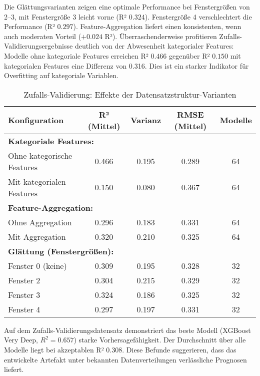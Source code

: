 Die Glättungsvarianten zeigen eine optimale Performance bei Fenstergrößen von 2–3, mit Fenstergröße 3 leicht vorne (R² $0.324$). Fenstergröße 4 verschlechtert die Performance (R² $0.297$). Feature-Aggregation liefert einen konsistenten, wenn auch moderaten Vorteil ($+0.024$ R²). Überraschenderweise profitieren Zufalls-Validierungsergebnisse deutlich von der Abwesenheit kategorialer Features: Modelle ohne kategoriale Features erreichen R² $0.466$ gegenüber R² $0.150$ mit kategorialen Features eine Differenz von 0.316. Dies ist ein starker Indikator für Overfitting auf kategoriale Variablen.

\begin{table}[H]
  \centering
  \begin{tabular}{lcccc}
    \toprule
    \textbf{Konfiguration} & \textbf{R² (Mittel)} & \textbf{Varianz} & \textbf{RMSE (Mittel)} & \textbf{Modelle} \\
    \midrule
    \multicolumn{5}{l}{\textbf{Kategoriale Features:}} \\
    Ohne kategorische Features & 0.466 & 0.195 & 0.289 & 64 \\
    Mit kategorialen Features & 0.150 & 0.080 & 0.367 & 64 \\
    \midrule
    \multicolumn{5}{l}{\textbf{Feature-Aggregation:}} \\
    Ohne Aggregation & 0.296 & 0.183 & 0.331 & 64 \\
    Mit Aggregation & 0.320 & 0.210 & 0.325 & 64 \\
    \midrule
    \multicolumn{5}{l}{\textbf{Glättung (Fenstergrößen):}} \\
    Fenster 0 (keine) & 0.309 & 0.195 & 0.328 & 32 \\
    Fenster 2 & 0.304 & 0.215 & 0.329 & 32 \\
    Fenster 3 & 0.324 & 0.186 & 0.325 & 32 \\
    Fenster 4 & 0.297 & 0.197 & 0.331 & 32 \\
    \bottomrule
  \end{tabular}
  \caption{Zufalls-Validierung: Effekte der Datensatzstruktur-Varianten}
  \label{tab:structure_random}
\end{table}

Auf dem Zufalls-Validierungsdatensatz demonstriert das beste Modell (XGBoost Very Deep, $R^2 = 0.657$) starke Vorhersagefähigkeit. Der Durchschnitt über alle Modelle liegt bei akzeptablen R² $0.308$. Diese Befunde suggerieren, dass das entwickelte Artefakt unter bekannten Datenverteilungen verlässliche Prognosen liefert.


